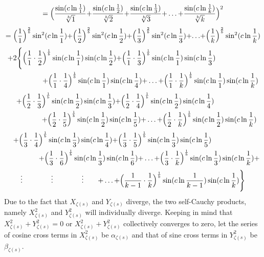\documentclass{amsart}
\begin{document}
	\[ = \Bigl( \frac{\sin({c\ln \frac{1}{1}})}{\sqrt[b]{1}} {+} \frac{\sin({c\ln \frac{1}{2}})}{\sqrt[b]{2}} {+} \frac{\sin({c\ln \frac{1}{3}})}{\sqrt[b]{3}} {+} \dots {+} \frac{\sin({c\ln \frac{1}{k}})}{\sqrt[b]{k}} \Bigr)^2 \]
	\[ = \Bigl( \frac{1}{1} \Bigr)^{\frac2b}\sin^2({c \ln \frac{1}{1}}) {+} \Bigl( \frac{1}{2} \Bigr)^{\frac2b}\sin^2({c \ln \frac{1}{2}}) {+} \Bigl( \frac{1}{3} \Bigr)^{\frac2b}\sin^2({c \ln \frac{1}{3}}) {+} {\dots} {+} \Bigl( \frac{1}{k} \Bigr)^{\frac2b}\sin^2({c \ln \frac{1}{k}}) \]
	\[
	\begin{aligned}
		{+}2\Biggl\{ \Bigl( \frac{1}{1} \cdot \frac{1}{2}& \Bigr)^\frac1b \sin(c \ln \frac{1}{1}) \sin(c \ln \frac{1}{2}) {+} \Bigl( \frac{1}{1} \cdot \frac{1}{3} \Bigr)^\frac1b \sin(c \ln \frac{1}{1}) \sin(c \ln \frac{1}{3}) \\ 
		& {+} \Bigl( \frac{1}{1} \cdot \frac{1}{4} \Bigr)^\frac1b \sin(c \ln \frac{1}{1}) \sin(c \ln \frac{1}{4}) {+} \dots {+} \Bigl( \frac{1}{1} \cdot \frac{1}{k} \Bigr)^\frac1b \sin(c \ln \frac{1}{1}) \sin(c \ln \frac{1}{k})  \\ 		
	\end{aligned}
	\]
	\[
	\begin{aligned}
		\quad {+} \Bigl( \frac{1}{2} \cdot \frac{1}{3}& \Bigr)^\frac1b \sin(c \ln \frac{1}{2}) \sin(c \ln \frac{1}{3}) {+} \Bigl( \frac{1}{2} \cdot \frac{1}{4} \Bigr)^\frac1b \sin(c \ln \frac{1}{2}) \sin(c \ln \frac{1}{4}) \\ 
		& {+} \Bigl( \frac{1}{2} \cdot \frac{1}{5} \Bigr)^\frac1b \sin(c \ln \frac{1}{2}) \sin(c \ln \frac{1}{5}) {+} \dots {+} \Bigl( \frac{1}{2} \cdot \frac{1}{k} \Bigr)^\frac1b \sin(c \ln \frac{1}{2}) \sin(c \ln \frac{1}{k})  \\ 		
	\end{aligned}
	\]
	\[
	\begin{aligned}
		\quad {+} \Bigl( \frac{1}{3} \cdot \frac{1}{4}& \Bigr)^\frac1b \sin(c \ln \frac{1}{3}) \sin(c \ln \frac{1}{4}) {+} \Bigl( \frac{1}{3} \cdot \frac{1}{5} \Bigr)^\frac1b \sin(c \ln \frac{1}{3}) \sin(c \ln \frac{1}{5}) \\ 
		& {+} \Bigl( \frac{1}{3} \cdot \frac{1}{6} \Bigr)^\frac1b \sin(c \ln \frac{1}{3}) \sin(c \ln \frac{1}{6}) {+} \dots {+} \Bigl( \frac{1}{3} \cdot \frac{1}{k} \Bigr)^\frac1b \sin(c \ln \frac{1}{3}) \sin(c \ln \frac{1}{k}) {+} \\ 		
	\end{aligned}
	\]
	\[
	\begin{aligned}
		\vdots \qquad\qquad \vdots \qquad\qquad \vdots \qquad {+} \dots {+} \Bigl( \frac{1}{k-1} \cdot \frac{1}{k} \Bigr)^\frac1b \sin(c \ln \frac{1}{k-1}) \sin(c \ln \frac{1}{k}) \Biggr\}
	\end{aligned}
	\]
	\[\]
	Due to the fact that $X_{\zeta(s)}$ and $Y_{\zeta(s)}$ diverge, the two self-Cauchy products, namely $X_{\zeta(s)}^2$ and $Y_{\zeta(s)}^2$ will individually diverge. Keeping in mind that $X_{\zeta(s)}^2 + Y_{\zeta(s)}^2 = 0$ or $X_{\zeta(s)}^2 + Y_{\zeta(s)}^2$ collectively converges to zero, let the series of cosine cross terms in $X_{\zeta(s)}^2$ be $\alpha_{\zeta(s)}$ and that of sine cross terms in $Y_{\zeta(s)}^2$ be $\beta_{\zeta(s)}$.
	
\end{document}
